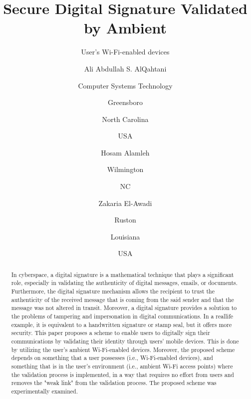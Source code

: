 \documentclass[sigconf]{acmart}
\begin{document}
\title{Secure Digital Signature Validated by Ambient}
\author{User's Wi-Fi-enabled devices}
\author{Ali Abdullah S. AlQahtani}
\author{Computer Systems Technology}
\author{Greensboro}
\author{North Carolina}
\author{USA}
\author{Hosam Alamleh}
\author{Wilmington}
\author{NC}
\author{Zakaria El-Awadi}
\author{Ruston}
\author{Louisiana}
\author{USA}
\begin{abstract}
In cyberspace, a digital signature is a mathematical technique that plays a signiﬁcant role, especially in validating the authenticity of digital messages, emails, or documents. Furthermore, the digital signature mechanism allows the recipient to trust the authenticity of the received message that is coming from the said sender and that the message was not altered in transit. Moreover, a digital signature provides a solution to the problems of tampering and impersonation in digital communications. In a reallife example, it is equivalent to a handwritten signature or stamp seal, but it offers more security. This paper proposes a scheme to enable users to digitally sign their communications by validating their identity through users' mobile devices. This is done by utilizing the user's ambient Wi-Fi-enabled devices. Moreover, the proposed scheme depends on something that a user possesses (i.e., Wi-Fi-enabled devices), and something that is in the user's environment (i.e., ambient Wi-Fi access points) where the validation process is implemented, in a way that requires no effort from users and removes the "weak link" from the validation process. The proposed scheme was experimentally examined.
\end{abstract}

\maketitle
\end{document}

